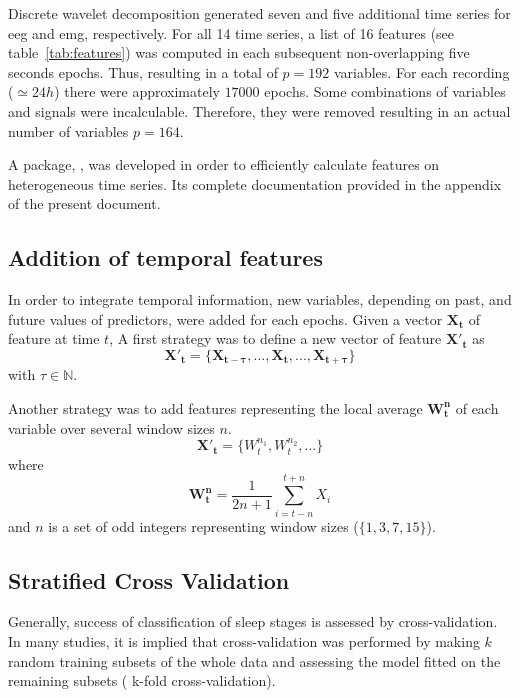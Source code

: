 Discrete wavelet decomposition generated seven and five additional time series for \gls{eeg} and \gls{emg}, respectively.
For all 14 time series, a list of 16 features (see table~\ref{tab:features}) was computed in each subsequent non-overlapping five seconds epochs.
Thus, resulting in a total of $p=192$ variables. For each recording ($\simeq 24h$) there were approximately $17000$ epochs.
Some combinations of variables and signals were incalculable.
Therefore, they were removed resulting in an actual number of variables $p=164$.



A \py{} package, \pr{}, was developed in order to efficiently
calculate features on heterogeneous time series.
Its complete documentation provided in the appendix of the present document.

\subsection{Addition of temporal features}
In order to integrate temporal information, new variables, depending on past, and future values of predictors, were added for each epochs.
Given a vector $\mathbf{X_t}$ of feature at time $t$,
A first strategy was to define a new vector of feature $\mathbf{{X'}_t}$ as
\begin{equation}
\mathbf{{X'}_t} = \{\mathbf{X_{t-\tau}}, ..., \mathbf{X_t}, ..., \mathbf{X_{t+\tau}}\}
\label{eq:tau}
\end{equation}
with $\tau \in \mathbb{N}$.

Another strategy was to add features representing the local average $\mathbf{W^n_t}$ of each variable over several window sizes $n$.
\begin{equation}
\mathbf{{X'}_t} = \{W^{n_1}_t, W^{n_2}_t, ...\}
\label{eq:window}
\end{equation}
where
\[
\mathbf{W^n_t} = \frac{1}{2n+1} \sum_{i = t-n}^{t+n}{X_i}
\]
and $n$ is a set of odd integers representing window sizes (\eg $\{1,3,7,15\}$).



\subsection{Stratified Cross Validation}
Generally, success of classification of sleep stages is assessed by cross-validation.
In many studies\citationneeded{}, it is implied that cross-validation was performed by making $k$ random training subsets
of the whole data and assessing the model fitted on the remaining subsets (\ie{} k-fold cross-validation).

